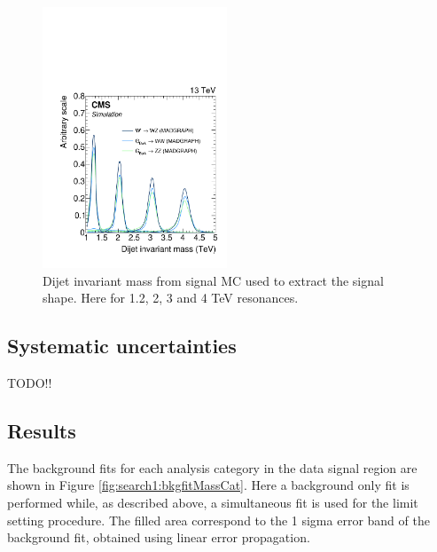 \begin{figure}[h!]
\centering
\includegraphics[width=0.49\textwidth]{figures/analysis/search1/B2G-16-004/Figure_005-a.pdf}
\caption{Dijet invariant mass from signal MC used to extract the signal shape. Here for 1.2, 2, 3 and 4 TeV resonances.}
\label{fig:searchI:fit-dataVV}
\end{figure}

\subsection{Systematic uncertainties}
\label{sec:searchI:sys}
TODO!!

\clearpage

\subsection{Results}
\label{sec:searchI:results}
The background fits for each analysis category in the data signal region are shown in Figure \ref{fig:search1:bkgfitMassCat}. Here a background only fit is performed while, as described above, a simultaneous fit is used for the limit setting procedure. The filled area correspond to the 1 sigma error band of the background fit, obtained using linear error propagation.

